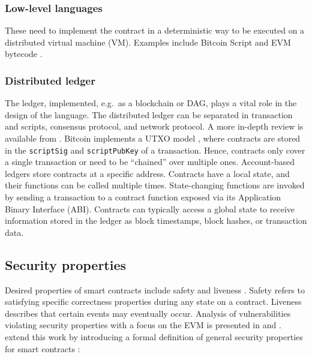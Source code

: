 \subsubsection{Low-level languages} These need to implement the contract in a deterministic way to be executed on a distributed virtual machine (VM). Examples include Bitcoin Script \cite{BitcoinWiki2018Script} and EVM bytecode \cite{Wood2014}.

\subsubsection{Distributed ledger} The ledger, implemented, e.g.\ as a blockchain or DAG, plays a vital role in the design of the language. 
The distributed ledger can be separated in transaction and scripts, consensus protocol, and network protocol. 
A more in-depth review is available from \cite{Bonneau2015}.
Bitcoin implements a UTXO model \cite{Nakamoto2008,Covaci2018}, where contracts are stored in the \texttt{scriptSig} and \texttt{scriptPubKey} of a transaction. 
Hence, contracts only cover a single transaction or need to be ``chained'' over multiple ones.
Account-based ledgers store contracts at a specific address.
Contracts have a local state, and their functions can be called multiple times.
State-changing functions are invoked by sending a transaction to a contract function exposed via its Application Binary Interface (ABI).
Contracts can typically access a global state to receive information stored in the ledger as block timestamps, block hashes, or transaction data. 



\subsection{Security properties}
Desired properties of smart contracts include safety and liveness \cite{Sergey2018}.
Safety refers to satisfying specific correctness properties during any state on a contract.
Liveness describes that certain events may eventually occur.
Analysis of vulnerabilities violating security properties with a focus on the EVM is presented in \cite{Luu2016} and \cite{Atzei2017}.
\citeauthor{Grishchenko2018} extend this work by introducing a formal definition of general security properties for smart contracts \cite{Grishchenko2018}:

